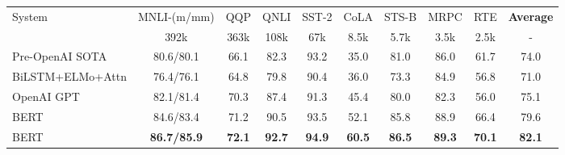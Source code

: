 \documentclass[11pt,a4paper]{article}
\newcommand{\eat}[1]{\ignorespaces}
\newcommand\bertbase{BERT\xspace}
\newcommand\bertlarge{BERT\xspace}
\begin{document}
\eat{
\vspace{.3cm}
\noindent\textbf{Cross-attention}
BERT is designed such that it does not distinguish between self-attention used within a single sequence and cross-attention used between multiple sequences. Cross-attention between
question and passage has been shown to be important for question-answering~\cite{bidaf}, where they cross
attend question and passage for two times.
When fine-tuning a twelve-layer BERT for question answering, the question and passage will cross attend to each other for {\em twelve} times given that question and passage are packed into a single input sequence
\emph{iteratively}. Moreover, the parameters for cross-attention are pretrained. The iterative attention also happened in OpenAI GPT, but
the second sequence cannot attend to the first sequence due to the unidirectionality constraint.
} 
\begin{table*}[t]
\small
\renewcommand{\arraystretch}{1.2}
\begin{center}
 \begin{tabular*}{\textwidth}{l@{\extracolsep{\fill}}cccccccc c}
    \toprule
System             &  MNLI-(m/mm)    & QQP        & QNLI       & SST-2      & CoLA       & STS-B      & MRPC       & RTE        & {\bf Average} \\
                  & 392k            & 363k       & 108k       & 67k        & 8.5k       & 5.7k       & 3.5k       & 2.5k       & -          \\ 
\hline
Pre-OpenAI SOTA    & 80.6/80.1       & 66.1       & 82.3       & 93.2       & 35.0       & 81.0       & 86.0       & 61.7       & 74.0       \\
BiLSTM+ELMo+Attn   & 76.4/76.1       & 64.8       & 79.8       & 90.4       & 36.0       & 73.3       & 84.9       & 56.8       & 71.0       \\
OpenAI GPT         & 82.1/81.4       & 70.3       & 87.4       & 91.3       & 45.4       & 80.0       & 82.3       & 56.0       & 75.1       \\

\hline
\bertbase          & 84.6/83.4       & 71.2       & 90.5       & 93.5       & 52.1       & 85.8       & 88.9       & 66.4       & 79.6       \\
\bertlarge         & {\bf 86.7/85.9} & {\bf 72.1} & {\bf 92.7} & {\bf 94.9} & {\bf 60.5} & {\bf 86.5} & {\bf 89.3} & {\bf 70.1} & {\bf 82.1} \\
    \bottomrule
   \end{tabular*}
   \caption{GLUE Test results, scored by the evaluation server ({\small \url{https://gluebenchmark.com/leaderboard}}). The number below each task denotes the number of training examples. The ``Average'' column is slightly different than the official GLUE score, since we exclude the problematic WNLI set.\footnote{See question 10 in \url{https://gluebenchmark.com/faq}.} 
BERT and OpenAI GPT are single-model, single task. F1 scores are reported for QQP and MRPC, Spearman correlations are reported for STS-B, and accuracy scores are reported for
   the other tasks. We exclude entries that use BERT as one of their components.}
   \label{tab:glue_official}
\end{center}
\end{table*}
\end{document}
